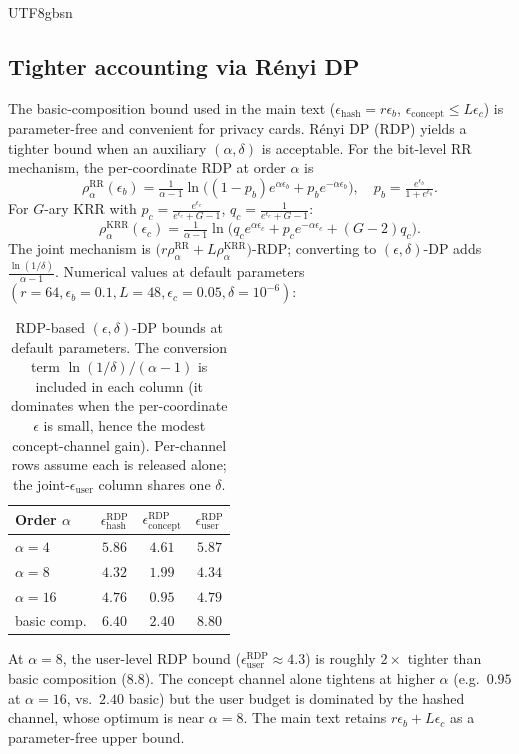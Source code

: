 \documentclass[acmsmall,natbib]{acmart}
\begin{document}
\begin{CJK*}{UTF8}{gbsn}
\subsection{Tighter accounting via R\'enyi DP}
\label{app:rdp}
The basic-composition bound used in the main text ($\epsilon_{\text{hash}}{=}r\epsilon_b$, $\epsilon_{\text{concept}}{\le}L\epsilon_c$) is parameter-free and convenient for privacy cards. R\'enyi DP (RDP) yields a tighter bound when an auxiliary $(\alpha,\delta)$ is acceptable. For the bit-level RR mechanism, the per-coordinate RDP at order $\alpha$ is
\[
\rho_\alpha^{\text{RR}}(\epsilon_b)=\tfrac{1}{\alpha-1}\ln\!\bigl((1-p_b)e^{\alpha\epsilon_b}+p_b e^{-\alpha\epsilon_b}\bigr),
\quad p_b=\tfrac{e^{\epsilon_b}}{1+e^{\epsilon_b}}.
\]
For $G$-ary KRR with $p_c{=}\tfrac{e^{\epsilon_c}}{e^{\epsilon_c}+G-1}$, $q_c{=}\tfrac{1}{e^{\epsilon_c}+G-1}$:
\[
\rho_\alpha^{\text{KRR}}(\epsilon_c)=\tfrac{1}{\alpha-1}\ln\!\bigl(q_c e^{\alpha\epsilon_c}+p_c e^{-\alpha\epsilon_c}+(G{-}2)q_c\bigr).
\]
The joint mechanism is $\bigl(r\rho_\alpha^{\text{RR}}{+}L\rho_\alpha^{\text{KRR}}\bigr)$-RDP; converting to $(\epsilon,\delta)$-DP adds $\tfrac{\ln(1/\delta)}{\alpha-1}$. Numerical values at default parameters $(r{=}64,\epsilon_b{=}0.1,L{=}48,\epsilon_c{=}0.05,\delta{=}10^{-6})$:

\begin{table}[h]
\centering
\caption{RDP-based $(\epsilon,\delta)$-DP bounds at default parameters. The conversion term $\ln(1/\delta)/(\alpha{-}1)$ is included in each column (it dominates when the per-coordinate $\epsilon$ is small, hence the modest concept-channel gain). Per-channel rows assume each is released alone; the joint-$\epsilon_{\text{user}}$ column shares one $\delta$.}
\label{tab:rdp}
\setlength{\tabcolsep}{4.0pt}
\begin{tabular}{lccc}
\toprule
\textbf{Order $\alpha$} & $\epsilon_{\text{hash}}^{\text{RDP}}$ & $\epsilon_{\text{concept}}^{\text{RDP}}$ & $\epsilon_{\text{user}}^{\text{RDP}}$ \\
\midrule
$\alpha=4$  & $5.86$ & $4.61$ & $5.87$ \\
$\alpha=8$  & $\mathbf{4.32}$ & $\mathbf{1.99}$ & $\mathbf{4.34}$ \\
$\alpha=16$ & $4.76$ & $0.95$ & $4.79$ \\
basic comp. & $6.40$ & $2.40$ & $8.80$ \\
\bottomrule
\end{tabular}
\end{table}

At $\alpha{=}8$, the user-level RDP bound ($\epsilon_{\text{user}}^{\text{RDP}}{\approx}4.3$) is roughly $2{\times}$ tighter than basic composition ($8.8$). The concept channel alone tightens at higher $\alpha$ (e.g.\ $0.95$ at $\alpha{=}16$, vs.\ $2.40$ basic) but the user budget is dominated by the hashed channel, whose optimum is near $\alpha{=}8$. The main text retains $r\epsilon_b{+}L\epsilon_c$ as a parameter-free upper bound.


\end{CJK*}
\end{document}
